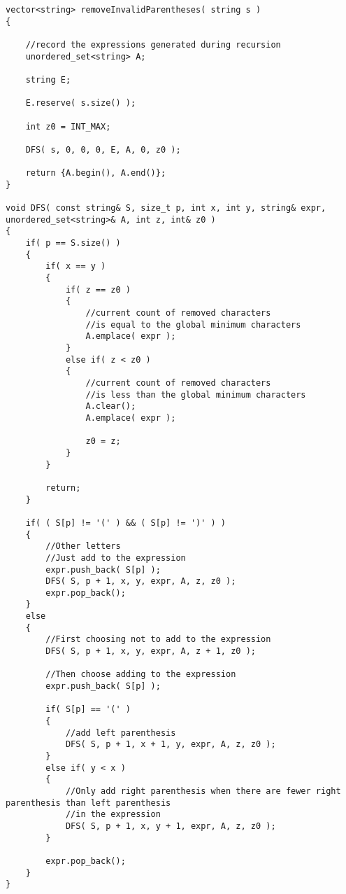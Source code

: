 \setcounter{lstlisting}{0}
\begin{lstlisting}[style=customc, caption={Recursive Method 1}]
vector<string> removeInvalidParentheses( string s )
{

    //record the expressions generated during recursion
    unordered_set<string> A;

    string E;

    E.reserve( s.size() );

    int z0 = INT_MAX;

    DFS( s, 0, 0, 0, E, A, 0, z0 );

    return {A.begin(), A.end()};
}

void DFS( const string& S, size_t p, int x, int y, string& expr, unordered_set<string>& A, int z, int& z0 )
{
    if( p == S.size() )
    {
        if( x == y )
        {
            if( z == z0 )
            {
                //current count of removed characters
                //is equal to the global minimum characters
                A.emplace( expr );
            }
            else if( z < z0 )
            {
                //current count of removed characters
                //is less than the global minimum characters
                A.clear();
                A.emplace( expr );

                z0 = z;
            }
        }

        return;
    }

    if( ( S[p] != '(' ) && ( S[p] != ')' ) )
    {
        //Other letters
        //Just add to the expression
        expr.push_back( S[p] );
        DFS( S, p + 1, x, y, expr, A, z, z0 );
        expr.pop_back();
    }
    else
    {
        //First choosing not to add to the expression
        DFS( S, p + 1, x, y, expr, A, z + 1, z0 );

        //Then choose adding to the expression
        expr.push_back( S[p] );

        if( S[p] == '(' )
        {
            //add left parenthesis
            DFS( S, p + 1, x + 1, y, expr, A, z, z0 );
        }
        else if( y < x )
        {
            //Only add right parenthesis when there are fewer right parenthesis than left parenthesis
            //in the expression
            DFS( S, p + 1, x, y + 1, expr, A, z, z0 );
        }

        expr.pop_back();
    }
}
\end{lstlisting}
